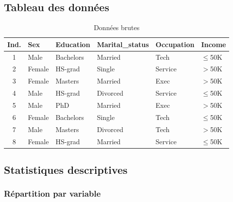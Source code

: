 \documentclass[12pt,a4paper]{article}
\begin{document}
\subsection{Tableau des données}

\begin{table}[H]
\centering
\caption{Données brutes}
\footnotesize
\begin{tabular}{|c|l|l|l|l|l|}
\hline
\textbf{Ind.} & \textbf{Sex} & \textbf{Education} & \textbf{Marital\_status} & \textbf{Occupation} & \textbf{Income} \\
\hline
1 & Male & Bachelors & Married & Tech & $\leq$50K \\
2 & Female & HS-grad & Single & Service & $>$50K \\
3 & Female & Masters & Married & Exec & $>$50K \\
4 & Male & HS-grad & Divorced & Service & $\leq$50K \\
5 & Male & PhD & Married & Exec & $>$50K \\
6 & Female & Bachelors & Single & Tech & $\leq$50K \\
7 & Male & Masters & Divorced & Tech & $>$50K \\
8 & Female & HS-grad & Married & Service & $\leq$50K \\
\hline
\end{tabular}
\end{table}

\subsection{Statistiques descriptives}

\subsubsection{Répartition par variable}
\end{document}
